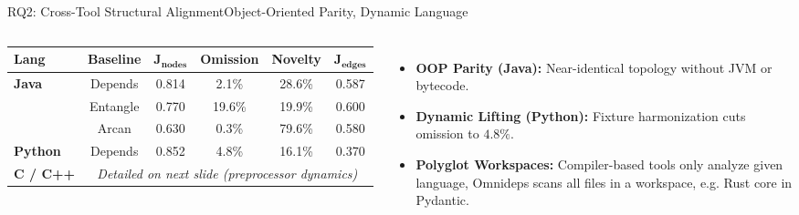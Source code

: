 \documentclass[aspectratio=169,10pt]{beamer}
\begin{document}
\begin{frame}{RQ2: Cross-Tool Structural Alignment}{Object-Oriented Parity, Dynamic Language}
  \begin{columns}[T,onlytextwidth]
      \par\vspace{0.15em}
      {\scriptsize
      \begin{tabular*}{\linewidth}{@{\extracolsep{\fill}}lccccc@{}}
        \toprule
        \textbf{Lang} & \textbf{Baseline} & $\mathbf{J_{\text{nodes}}}$ & \textbf{Omission} & \textbf{Novelty} & $\mathbf{J_{\text{edges}}}$ \\
        \midrule
        \textbf{Java}   & Depends  & 0.814 & 2.1\%  & 28.6\% & 0.587 \\
                        & Entangle & 0.770 & 19.6\% & 19.9\% & 0.600 \\
                        & Arcan    & 0.630 & 0.3\%  & 79.6\% & 0.580 \\
        \midrule
        \textbf{Python} & Depends  & 0.852 & 4.8\%  & 16.1\% & 0.370 \\
        \midrule
        \textbf{C / C++}& \multicolumn{5}{c}{\textit{Detailed on next slide (preprocessor dynamics)}} \\
        \bottomrule
      \end{tabular*}}\par
      \vspace{1em}

      \par\vspace{0.15em}
      {\scriptsize
      \begin{itemize}\setlength{\itemsep}{0.25em}
        \item \textbf{OOP Parity (Java):} Near-identical topology without JVM or bytecode.\par
        \item \textbf{Dynamic Lifting (Python):} Fixture harmonization cuts omission to $4.8\%$.\par
        \item \textbf{Polyglot Workspaces:} Compiler-based tools only analyze given language, Omnideps scans all files in a workspace, e.g. Rust core in Pydantic.\par
      \end{itemize}\par}
      \vspace{0.35em}


\end{columns}
\end{frame}
\end{document}
